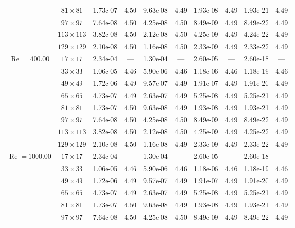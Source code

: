 \documentclass[preprint, 12pt]{elsarticle}
\begin{document}
\begin{center}
\begin{table}[H]
{\begin{tabular*}{\textwidth}{@{\extracolsep\fill}cccccccccc@{}}
    & $81\times 81$ & 1.73e-07 & 4.50 & 9.63e-08 & 4.49 & 1.93e-08 & 4.49 & 1.93e-21 & 4.49 \\
    & $97\times 97$ & 7.64e-08 & 4.50 & 4.25e-08 & 4.50 & 8.49e-09 & 4.49 & 8.49e-22 & 4.49 \\
    & $113\times 113$ & 3.82e-08 & 4.50 & 2.12e-08 & 4.50 & 4.25e-09 & 4.49 & 4.24e-22 & 4.49 \\
    & $129\times 129$ & 2.10e-08 & 4.50 & 1.16e-08 & 4.50 & 2.33e-09 & 4.49 & 2.33e-22 & 4.49 \\
    \hline
    \multirow{7}{*}{$\operatorname{Re}=400.00$} & $17\times 17$ & 2.34e-04 & --- & 1.30e-04 & --- & 2.60e-05 & --- & 2.60e-18 & --- \\
    & $33\times 33$ & 1.06e-05 & 4.46 & 5.90e-06 & 4.46 & 1.18e-06 & 4.46 & 1.18e-19 & 4.46 \\
    & $49\times 49$ & 1.72e-06 & 4.49 & 9.57e-07 & 4.49 & 1.91e-07 & 4.49 & 1.91e-20 & 4.49 \\
    \multirow{3}{*}{$\operatorname{Wi}=5$} & $65\times 65$ & 4.73e-07 & 4.49 & 2.63e-07 & 4.49 & 5.25e-08 & 4.49 & 5.25e-21 & 4.49 \\
    & $81\times 81$ & 1.73e-07 & 4.50 & 9.63e-08 & 4.49 & 1.93e-08 & 4.49 & 1.93e-21 & 4.49 \\
    & $97\times 97$ & 7.64e-08 & 4.50 & 4.25e-08 & 4.50 & 8.49e-09 & 4.49 & 8.49e-22 & 4.49 \\
    & $113\times 113$ & 3.82e-08 & 4.50 & 2.12e-08 & 4.50 & 4.25e-09 & 4.49 & 4.25e-22 & 4.49 \\
    & $129\times 129$ & 2.10e-08 & 4.50 & 1.16e-08 & 4.49 & 2.33e-09 & 4.49 & 2.33e-22 & 4.49 \\
    \hline
    \multirow{7}{*}{$\operatorname{Re}=1000.00$} & $17\times 17$ & 2.34e-04 & --- & 1.30e-04 & --- & 2.60e-05 & --- & 2.60e-18 & --- \\
    & $33\times 33$ & 1.06e-05 & 4.46 & 5.90e-06 & 4.46 & 1.18e-06 & 4.46 & 1.18e-19 & 4.46 \\
    & $49\times 49$ & 1.72e-06 & 4.49 & 9.57e-07 & 4.49 & 1.91e-07 & 4.49 & 1.91e-20 & 4.49 \\
    \multirow{3}{*}{$\operatorname{Wi}=5$} & $65\times 65$ & 4.73e-07 & 4.49 & 2.63e-07 & 4.49 & 5.25e-08 & 4.49 & 5.25e-21 & 4.49 \\
    & $81\times 81$ & 1.73e-07 & 4.50 & 9.63e-08 & 4.49 & 1.93e-08 & 4.49 & 1.93e-21 & 4.49 \\
    & $97\times 97$ & 7.64e-08 & 4.50 & 4.25e-08 & 4.50 & 8.49e-09 & 4.49 & 8.49e-22 & 4.49 \\

\end{tabular*}}
\end{table}
\end{center}
\end{document}
